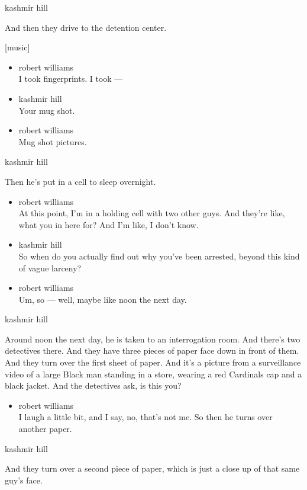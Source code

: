 kashmir hill

And then they drive to the detention center.

{[}music{]}

\begin{itemize}
\item
  robert williams\\
  I took fingerprints. I took ---
\item
  kashmir hill\\
  Your mug shot.
\item
  robert williams\\
  Mug shot pictures.
\end{itemize}

kashmir hill

Then he's put in a cell to sleep overnight.

\begin{itemize}
\item
  robert williams\\
  At this point, I'm in a holding cell with two other guys. And they're
  like, what you in here for? And I'm like, I don't know.
\item
  kashmir hill\\
  So when do you actually find out why you've been arrested, beyond this
  kind of vague larceny?
\item
  robert williams\\
  Um, so --- well, maybe like noon the next day.
\end{itemize}

kashmir hill

Around noon the next day, he is taken to an interrogation room. And
there's two detectives there. And they have three pieces of paper face
down in front of them. And they turn over the first sheet of paper. And
it's a picture from a surveillance video of a large Black man standing
in a store, wearing a red Cardinals cap and a black jacket. And the
detectives ask, is this you?

\begin{itemize}
\tightlist
\item
  robert williams\\
  I laugh a little bit, and I say, no, that's not me. So then he turns
  over another paper.
\end{itemize}

kashmir hill

And they turn over a second piece of paper, which is just a close up of
that same guy's face.

